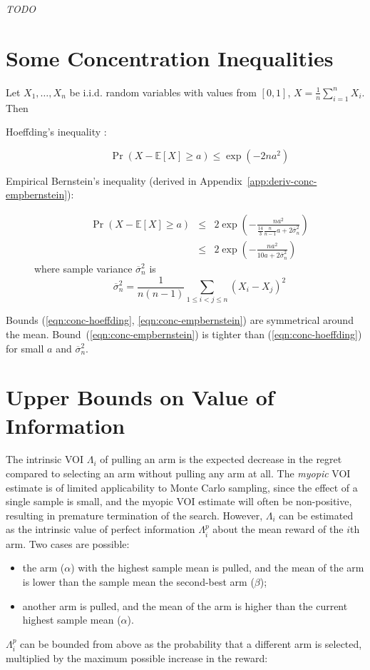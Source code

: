 \documentclass{article}
\newcommand {\IE} {\ensuremath {\mathbb{E}}}
\begin{document}
\textit{TODO}

\section{Some Concentration Inequalities}

Let $X_1, \ldots, X_n$ be i.i.d. random variables with values from $[0,1]$,
$X=\frac 1 n \sum_{i=1}^n X_i$. Then 
\begin{description}
\item[Hoeffding's inequality \rm{\cite{Hoeffding.ineq}}:] 
\begin{equation}
\Pr(X-\IE[X] \ge a) \le \exp ( -2na^2)
\label{eqn:conc-hoeffding}
\end{equation}
\item[Empirical Bernstein's inequality
  \rm{\cite{MaurerPontil.benrstein}} \textrm{(derived in Appendix~\ref{app:deriv-conc-empbernstein})}:]
\begin{eqnarray}
\Pr(X-\IE[X] \ge a) &\le& 2\exp \left( - \frac {na^2} {\frac {14} {3}
                          \frac {n} {n-1}a+2\overline\sigma_n^2}\right)\nonumber\\
                    &\le& 2\exp \left( - \frac {na^2} {10a+2\overline\sigma_n^2}\right)
\label{eqn:conc-empbernstein}
\end{eqnarray}
where sample variance $\overline\sigma_n^2$ is
\begin{equation}
\overline\sigma_n^2=\frac 1 {n(n-1)} \sum_{1\le i < j\le n}(X_i-X_j)^2
\label{eqn:sample-variance}
\end{equation}
\end{description}
Bounds (\ref{eqn:conc-hoeffding}, \ref{eqn:conc-empbernstein}) are symmetrical
around the mean. Bound~(\ref{eqn:conc-empbernstein}) is tighter than
(\ref{eqn:conc-hoeffding}) for small $a$ and $\overline\sigma_n^2$. 

\section{Upper Bounds on Value of Information}

The intrinsic VOI $\Lambda_i$ of pulling an arm is the expected decrease
in the regret compared to selecting an arm without pulling any arm at
all. The \textit{myopic} VOI estimate is of limited applicability to
Monte Carlo sampling, since the effect of a single sample is small,
and the myopic VOI estimate will often be non-positive, resulting in premature
termination of the search. However, $\Lambda_i$ can be estimated as the intrinsic 
value of perfect information $\Lambda_i^p$ about the mean reward of the $i$th arm. Two
cases are possible:
\begin{itemize}
\item the arm ($\alpha$) with the highest sample mean is pulled, and the 
mean of the arm is lower than the sample mean the second-best arm ($\beta$);
\item another arm is pulled, and the mean of the arm is higher
than the current highest sample mean ($\alpha$).
\end{itemize}
$\Lambda_i^p$ can be bounded from above as the probability that a
different arm is selected, multiplied by the
maximum possible increase in the reward:
\end{document}
